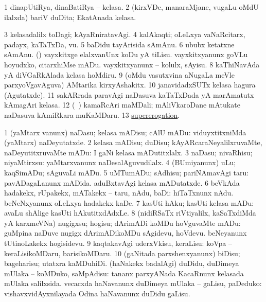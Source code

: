 \noindent
\gl{\pagu}
\expl{}
\bmng
\bnum
\num{1}  dinapUtiRya, dinaBatiRya -- kelasa. 
\num{2}  (kirxVDe, manaraMjane, \mo vugaLu oMdU ilalxda) bariV duDita; EkatAnada kelasa. 
\num{3}  kelasadalilx toDagi; kAyaRniratavAgi. 
\num{4}  kalAkaqti; oLeLxya vaNaRcitarx, padayx, kaTaTxDa, \mo vu. 
\num{5}  baDidu tayArisida sAmAnu. 
\num{6}  ububx ketatxne sAmAnu. 
  (\AmA) 
\banum
{} vayxkitxge elalxvanUnx koDu yA tiLisu. 
 vayxkitxyanunx goVLu hoyudxko, citarxhiMse mADu. 
 vayxkitxyanunx -- kolulx, sAyisu. 
\eanum
\numie
\num{8}  kaThiNavAda yA diVGaRkAlada kelasa hoMdiru. 
\num{9}  (oMdu vasutxvina aNugaLa meVle parxyoVgavAguva) AMtarika kirxyAshakitx. 
\num{10}  janavidadxSUTx kelasa hagura (Agutatxde). 
\num{11}  sakARrada paravAgi naDasuva kaTaTxDada yA marAmatutx kAmagAri kelasa. 
\num{12}  (\kanmu\ \birx) kamaRcAri maMDali; mAliVkaroDane mAtukate naDasuva kAmiRkara muKaMDaru. 
\num{13}  \hyperref{kandict_s.pdf}{S}{supererogation pagu}{supererogation}. 
\enum
\emng
\eentry

\bentry
{} 
\gl{\kirx}


\noindent
\gl{\sakirx}
\bmng
\bnum
\num{1} (yaMtarx \mo vanunx) naDasu; kelasa mADisu; cAlU mADu:  viduyxtitxniMda (yaMtarx) naDeyutatxde. 
\num{2} kelasa mADisu; duDisu; kAyARcaraNeyalilxruvaMte, naDeyutitxruvaMte mADu:  I gaNi kelasa mADutitxlalx. 
\num{3} naDasu; nivaRhisu; niyaMtirxsu:  yaMtarxvanunx naDesalAguvudilalx. 
\num{4} (BUmiyanunx) uLu; kaqSimADu; sAguvaLi mADu. 
\num{5} uMTumADu; sAdhisu; pariNAmavAgi taru:  pavADagaLanunx mADida.  aduBxtavAgi kelasa mADutatxde. 
\num{6} beVkAda hadakekx, rUpakekx, mATakekx -- taru, nAdu, baDi:  hiTaTxnunx nAdu.  beNeNxyanunx oLeLxya hadakekx kaDe. 
\num{7} kasUti hAku; kasUti kelasa mADu:  avaLu shAlige kasUti hAkutitxdAdxLe. 
\num{8} (nidiRSaTx riVtiyalilx, kaSaTxdiMda yA karxmeVNa) nugigxsu; hogisu; dArimADi koMDu hoVguvaMte mADu:  guMpina naDuve nugigx dArimADikoMDu sAgidevu, hoVdevu.  beNeyanunx tUtinoLakekx hogisidevu. 
\num{9} kaqtakavAgi uderxVkisu, keraLisu:  koVpa -- keraLisikoMDaru, barisikoMDaru. 
\num{10} (gaNitada parxshenxyanunx) biDisu; bageharisu; utatxra kaMDuhiDi. 
\banum
{} (haNakekx badalAgi) duDidu, duDimeya mUlaka -- koMDuko, saMpAdisu:   tananx parxyANada KacaRnunx kelasada mUlaka salilxsida. 
 vecacxda haNavanunx duDimeya mUlaka -- gaLisu, paDeduko:  vishavxvidAyxnilayada Odina haNavanunx duDidu gaLisu. 
\eanum
\numie
\enum
\emng

